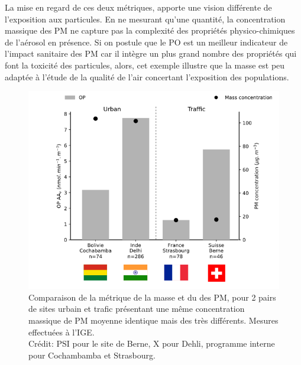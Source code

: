 La mise en regard de ces deux métriques, apporte une vision différente de l'exposition
aux particules.
En ne mesurant qu'une quantité, la concentration massique des PM ne capture pas la complexité
des propriétés physico-chimiques de l'aérosol en présence. Si on postule que le PO est
un meilleur indicateur de l'impact sanitaire des PM car il intègre un plus grand 
nombre des propriétés qui font la toxicité des particules, alors, cet exemple illustre
que la masse est peu adaptée à l'étude de la qualité de l'air concertant l'exposition 
des populations.


\begin{figure}[ht!]
    \centering
    \includegraphics[width=0.7\linewidth]{figures/chapter04/OPAAv_4sites.png}
    \caption{Comparaison de la métrique de la masse et du \POAAv{} des PM, pour 2 pairs
        de sites urbain et trafic présentant une même concentration massique de PM
        moyenne identique mais des \POAAv{} très différents. Mesures effectuées à l'IGE.\\
        Crédit: PSI pour le site de Berne, X pour Dehli, programme interne pour
        Cochambamba et Strasbourg.
    }%
    \label{fig:OPAAv_4sites}
\end{figure}


